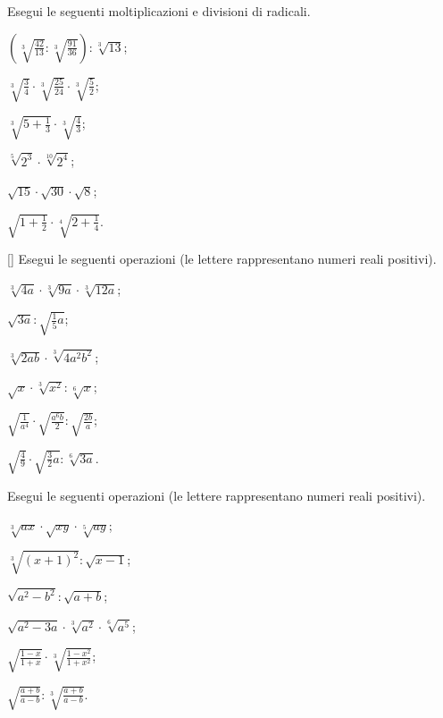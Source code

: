 \begin{esercizio}[\Ast]
 \label{ese:2.38}
Esegui le seguenti moltiplicazioni e divisioni di radicali.
 \begin{multicols}{3}
 \begin{enumeratea}
 \item $\left(\sqrt[3]{\frac{42}{13}}:\sqrt[3]{\frac{91}{36}}\right):\sqrt[3]{13}$;
 \item $\sqrt[3]{\frac 3 4}\cdot \sqrt[3]{\frac{25}{24}}\cdot \sqrt[3]{\frac 5 2}$;
 \item $\sqrt[3]{5+\frac 1 3}\cdot \sqrt[3]{\frac 4 3}$;
 \item $\sqrt[5]{2^3}\cdot \sqrt[10]{2^4}$;
 \item $\sqrt{15}\cdot \sqrt{30}\cdot \sqrt 8$;
 \item $\sqrt{1+\frac 1 2}\cdot \sqrt[4]{2+\frac 1 4}$.
 \end{enumeratea}
 \end{multicols}
\end{esercizio}

\begin{esercizio}
 \label{ese:2.39}[\Ast]
Esegui le seguenti operazioni (le lettere rappresentano numeri reali positivi).
 \begin{multicols}{3}
 \begin{enumeratea}
 \item $\sqrt[3]{4a}\cdot \sqrt[3]{9a}\cdot \sqrt[3]{12a}$;
 \item $\sqrt{3a}:\sqrt{\frac 1 5a}$;
 \item $\sqrt[3]{2ab}\cdot \sqrt[3]{4a^2b^2}$;
 \item $\sqrt x\cdot \sqrt[3]{x^2}:\sqrt[6]x$;
 \item $\sqrt{\frac 1{a^4}}\cdot \sqrt{\frac{a^6b} 2}:\sqrt{\frac{2b} a}$;
 \item $\sqrt{\frac 4 9}\cdot \sqrt{\frac 3 2a}:\sqrt[6]{3a}$.
 \end{enumeratea}
 \end{multicols}
\end{esercizio}

\begin{esercizio}[\Ast]
 \label{ese:2.40}
Esegui le seguenti operazioni (le lettere rappresentano numeri reali positivi).
 \begin{multicols}{3}
 \begin{enumeratea}
 \item $\sqrt[3]{ax}\cdot \sqrt{xy}\cdot \sqrt[5]{ay}$;
 \item $\sqrt[3]{(x+1)^2}:\sqrt{x-1}$;
 \item $\sqrt{a^2-b^2}:\sqrt{a+b}$;
 \item $\sqrt{a^2-3a}\cdot \sqrt[3]{a^2}\cdot \sqrt[6]{a^5}$;
 \item $\sqrt{\frac{1-x}{1+x}}\cdot \sqrt[3]{\frac{1-x^2}{1+x^2}}$;
 \item $\sqrt{\frac{a+b}{a-b}}:\sqrt[3]{\frac{a+b}{a-b}}$.
 \end{enumeratea}
 \end{multicols}
\end{esercizio}

